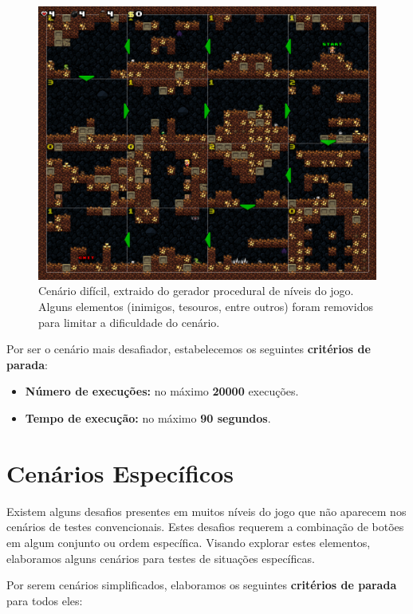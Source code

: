 \begin{figure}[H]
\centering
\includegraphics[width=\textwidth / 2]{fig/levels/level3.pdf}
\caption{Cenário difícil, extraido do gerador procedural de níveis do jogo.
	Alguns elementos (inimigos, tesouros, entre outros) foram removidos para
	limitar a dificuldade do cenário.}
\label{fig:level3}
\end{figure}


Por ser o cenário mais desafiador, estabelecemos os seguintes \textbf{critérios
de parada}:

\begin{itemize}
	\item \textbf{Número de execuções:} no máximo \textbf{20000} execuções.
	\item \textbf{Tempo de execução:} no máximo \textbf{90 segundos}.
\end{itemize}


\section{\label{section:scenarios-specific}Cenários Específicos}

Existem alguns desafios presentes em muitos níveis do jogo que não aparecem nos
cenários de testes convencionais. Estes desafios requerem a combinação de botões
em algum conjunto ou ordem específica. Visando explorar estes elementos,
elaboramos alguns cenários para testes de situações específicas.

Por serem cenários simplificados, elaboramos os seguintes \textbf{critérios de
parada} para todos eles:

